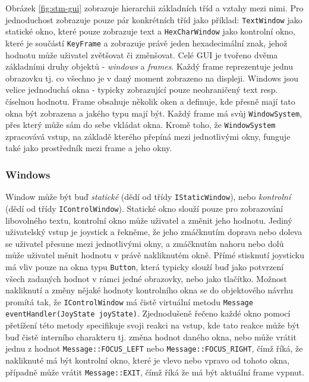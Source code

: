 Obrázek \ref{fig:stm-gui} zobrazuje hierarchii základních tříd a vztahy mezi nimi.
Pro jednoduchost zobrazuje pouze pár konkrétních tříd jako příklad: \texttt{TextWindow} jako statické
okno, které pouze zobrazuje text a \texttt{HexCharWindow} jako kontrolní okno, které je součástí
\texttt{KeyFrame} a zobrazuje právě jeden hexadecimální znak, jehož hodnotu může uživatel
zvětšovat či změnšovat.
Celé GUI je tvořeno dvěma základními druhy objektů - \emph{windows} a \emph{frames}.
Každý frame reprezentuje jednu obrazovku tj. co všechno je v daný moment zobrazeno na displeji.
Windows jsou velice jednoduchá okna - typicky zobrazující pouze neohraničený text resp. číselnou
hodnotu.
Frame obsahuje několik oken a definuje, kde přesně mají tato okna být zobrazena a jakého typu
mají být.
Každý frame má svůj \texttt{WindowSystem}, přes který může sám do sebe vkládat okna.
Kromě toho, že \texttt{WindowSystem} zpracovává vstup, na základě kterého přepíná mezi jednotlivými okny,
funguje také jako prostředník mezi frame a jeho okny.

\subsubsection{Windows}
Window může být buď \emph{statické} (dědí od třídy \texttt{IStaticWindow}), nebo \emph{kontrolní}
(dědí od třídy \texttt{IControlWindow}).
Statické okno slouží pouze pro zobrazování libovolného textu, kontrolní okno může uživatel 
a změnit jeho hodnotu.
Jediný uživatelský vstup je joystick a řekněme, že jeho zmáčknutím doprava nebo doleva se uživatel
přesune mezi jednotlivými okny, a zmáčknutím nahoru nebo dolů může uživatel měnit hodnotu
v právě nakliknutém okně.
Přímé stisknutí joysticku má vliv pouze na okna typu \texttt{Button}, která typicky slouží buď jako
potvrzení všech zadaných hodnot v rámci jedné obrazovky, nebo jako  tlačítko.
Možnost nakliknutí a změny nějaké hodnoty kontrolního okna se do objektového návrhu promítá tak,
že \texttt{IControlWindow} má čistě virtuální metodu \texttt{Message eventHandler(JoyState joyState)}.
Zjednodušeně řečeno každé okno pomocí přetížení této metody specifikuje svoji reakci na vstup,
kde tato reakce může být buď čistě interního charakteru tj. změna hodnot daného okna, nebo může
vrátit jednu z hodnot \texttt{Message::FOCUS\_LEFT} nebo \texttt{Message::FOCUS\_RIGHT}, čímž
říká, že nakliknuté má být kontrolní okno, které je vlevo nebo vpravo od tohoto okna, případně
může vrátit \texttt{Message::EXIT}, čímž říká že má být aktuální frame vypnut.

